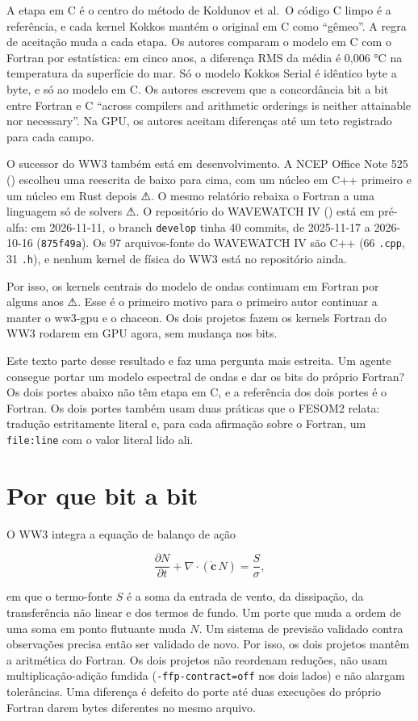 \documentclass[10pt,a4paper,]{article}
\begin{document}
A etapa em C é o centro do método de Koldunov et al.~O código C limpo é
a referência, e cada kernel Kokkos mantém o original em C como
``gêmeo''. A regra de aceitação muda a cada etapa. Os autores comparam o
modelo em C com o Fortran por estatística: em cinco anos, a diferença
RMS da média é 0,006 °C na temperatura da superfície do mar. Só o modelo
Kokkos Serial é idêntico byte a byte, e só ao modelo em C. Os autores
escrevem que a concordância bit a bit entre Fortran e C ``across
compilers and arithmetic orderings is neither attainable nor
necessary''. Na GPU, os autores aceitam diferenças até um teto
registrado para cada campo.

O sucessor do WW3 também está em desenvolvimento. A NCEP Office Note 525
() escolheu uma reescrita de baixo para
cima, com um núcleo em C++ primeiro e um núcleo em Rust depois ⚠. O
mesmo relatório rebaixa o Fortran a uma linguagem só de solvers ⚠. O
repositório do WAVEWATCH IV () está em pré-alfa: em 2026-11-11, o branch
\texttt{develop} tinha 40 commits, de 2025-11-17 a 2026-10-16
(\texttt{875f49a}). Os 97 arquivos-fonte do WAVEWATCH IV são C++ (66
\texttt{.cpp}, 31 \texttt{.h}), e nenhum kernel de física do WW3 está no
repositório ainda.

Por isso, os kernels centrais do modelo de ondas continuam em Fortran
por alguns anos ⚠. Esse é o primeiro motivo para o primeiro autor
continuar a manter o ww3-gpu e o chaceon. Os dois projetos fazem os
kernels Fortran do WW3 rodarem em GPU agora, sem mudança nos bits.

Este texto parte desse resultado e faz uma pergunta mais estreita. Um
agente consegue portar um modelo espectral de ondas e dar os bits do
próprio Fortran? Os dois portes abaixo não têm etapa em C, e a
referência dos dois portes é o Fortran. Os dois portes também usam duas
práticas que o FESOM2 relata: tradução estritamente literal e, para cada
afirmação sobre o Fortran, um \texttt{file:line} com o valor literal
lido ali.

\section{Por que bit a bit}\label{sec:why}

O WW3 integra a equação de balanço de ação

\[\frac{\partial N}{\partial t} + \nabla\cdot(\dot{\mathbf{c}}\,N) = \frac{S}{\sigma},\]

em que o termo-fonte \(S\) é a soma da entrada de vento, da dissipação,
da transferência não linear e dos termos de fundo. Um porte que muda a
ordem de uma soma em ponto flutuante muda \(N\). Um sistema de previsão
validado contra observações precisa então ser validado de novo. Por
isso, os dois projetos mantêm a aritmética do Fortran. Os dois projetos
não reordenam reduções, não usam multiplicação-adição fundida
(\texttt{-ffp-contract=off} nos dois lados) e não alargam tolerâncias.
Uma diferença é defeito do porte até duas execuções do próprio Fortran
darem bytes diferentes no mesmo arquivo.
\end{document}
